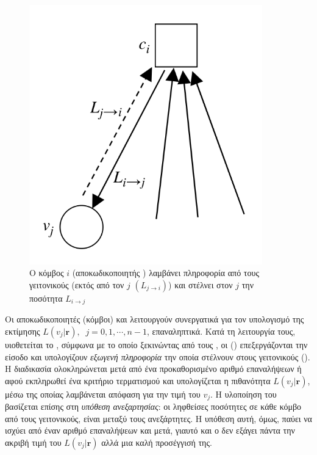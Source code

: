 \begin{figure}[h]
\begin{minipage}{0.45\textwidth}
        \centering
        \includegraphics[width=0.9\textwidth]{figures/CN.png}
        \caption{Ο κόμβος  $i$ (αποκωδικοποιητής ) λαμβάνει πληροφορία από τους γειτονικούς  (εκτός από τον $j$ $(L_{j\to i})$) και στέλνει στον  $j$ την ποσότητα $L_{i\to j}$}
        \label{fig:CN}
    \end{minipage}
\end{figure}

Οι αποκωδικοποιητές (κόμβοι)  και  λειτουργούν συνεργατικά για τον υπολογισμό της εκτίμησης $L(v_j|\mathbf{r}),\;\;j=0,1,\cdots,n-1$, επαναληπτικά. Κατά τη λειτουργία τους, υιοθετείται το , σύμφωνα με το οποίο ξεκινώντας από τους , οι  () επεξεργάζονται την είσοδο και υπολογίζουν \textit{εξωγενή πληροφορία} την οποία στέλνουν στους γειτονικούς  (). Η διαδικασία ολοκληρώνεται μετά από ένα προκαθορισμένο αριθμό επαναλήψεων ή αφού εκπληρωθεί ένα κριτήριο τερματισμού και υπολογίζεται η πιθανότητα $L(v_j|\mathbf{r})$, μέσω της οποίας λαμβάνεται απόφαση για την τιμή του  $v_j$. Η υλοποίηση του  βασίζεται επίσης στη \textit{υπόθεση ανεξαρτησίας}: οι ληφθείσες ποσότητες  σε κάθε κόμβο από τους γειτονικούς, είναι μεταξύ τους ανεξάρτητες. Η υπόθεση αυτή, όμως, παύει να ισχύει από έναν αριθμό επαναλήψεων και μετά, γι\textquotesingle αυτό και ο  δεν εξάγει πάντα την ακριβή τιμή του $L(v_j|\mathbf{r})$ αλλά μια καλή προσέγγισή της.

